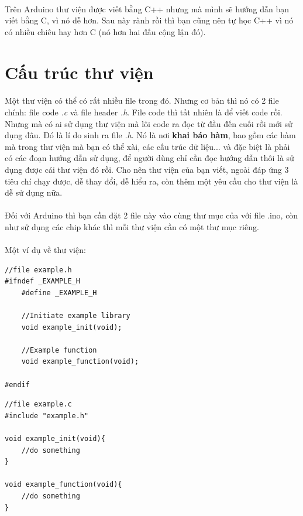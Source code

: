 \documentclass[12pt,a5paper]{book}
\begin{document}
\paragraph{}
Trên Arduino thư viện được viết bằng C++ nhưng mà mình sẽ hướng dẫn bạn viết bằng C, vì nó dễ hơn. Sau này rành rồi thì bạn cũng nên tự học C++ vì nó có nhiều chiêu hay hơn C (nó hơn hai đấu cộng lận đó).
\section{Cấu trúc thư viện}
\paragraph{}
Một thư viện có thể có rất nhiều file trong đó. Nhưng cơ bản thì nó có 2 file chính: file code \textit{.c} và file header \textit{.h}. File code thì tất nhiên là để viết code rồi. Nhưng mà có ai sử dụng thư viện mà lôi code ra đọc từ đầu đến cuối rồi mới sử dụng đâu. Đó là lí do sinh ra file \textit{.h}. Nó là nơi \textbf{khai báo hàm}, bao gồm các hàm mà trong thư viện mà bạn có thể xài, các cấu trúc dữ liệu... và đặc biệt là phải có các đoạn hướng dẫn sử dụng, để người dùng chỉ cần đọc hướng dẫn thôi là sử dụng được cái thư viện đó rồi. Cho nên thư viện của bạn viết, ngoài đáp ứng 3 tiêu chí chạy được, dễ thay đổi, dễ hiểu ra, còn thêm một yêu cầu cho thư viện là dễ sử dụng nữa.
\paragraph{}
Đối với Arduino thì bạn cần đặt 2 file này vào cùng thư mục của với file .ino, còn như sử dụng các chip khác thì mỗi thư viện cần có một thư mục riêng.
\paragraph{}
Một ví dụ về thư viện:
\begin{lstlisting}
//file example.h
#ifndef _EXAMPLE_H
	#define _EXAMPLE_H

	//Initiate example library 
	void example_init(void);

	//Example function
	void example_function(void);

#endif
\end{lstlisting}

\begin{lstlisting}
//file example.c
#include "example.h"

void example_init(void){
	//do something
}

void example_function(void){
	//do something
}

\end{lstlisting}
\end{document}
